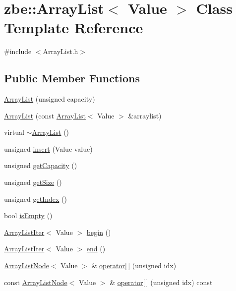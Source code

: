 \hypertarget{classzbe_1_1_array_list}{}\section{zbe\+:\+:Array\+List$<$ Value $>$ Class Template Reference}
\label{classzbe_1_1_array_list}


{\ttfamily \#include $<$Array\+List.\+h$>$}

\subsection*{Public Member Functions}
\begin{DoxyCompactItemize}
\item 
\hyperlink{classzbe_1_1_array_list_a5c68eae84a7d619114182e5efc26f6cd}{Array\+List} (unsigned capacity)
\item 
\hyperlink{classzbe_1_1_array_list_a512fb8d28a5e19493eabe7433738aa92}{Array\+List} (const \hyperlink{classzbe_1_1_array_list}{Array\+List}$<$ Value $>$ \&arraylist)
\item 
virtual \hyperlink{classzbe_1_1_array_list_a3ee1183e2a3ecda6f3e08cd180ccc09d}{$\sim$\+Array\+List} ()
\item 
unsigned \hyperlink{classzbe_1_1_array_list_aef119e95e8f11c2caf400e02a9b243d2}{insert} (Value value)
\item 
unsigned \hyperlink{classzbe_1_1_array_list_a95ed9fffe9ca1db6fe7ff47ba41cbacc}{get\+Capacity} ()
\item 
unsigned \hyperlink{classzbe_1_1_array_list_a32ac4ac895263b57c7e4a17370c89b5f}{get\+Size} ()
\item 
unsigned \hyperlink{classzbe_1_1_array_list_a6e560121fa7d27cf639399d82f3b93c9}{get\+Index} ()
\item 
bool \hyperlink{classzbe_1_1_array_list_ac78cf70f5316419ea831be59f6da0865}{is\+Empty} ()
\item 
\hyperlink{classzbe_1_1_array_list_iter}{Array\+List\+Iter}$<$ Value $>$ \hyperlink{classzbe_1_1_array_list_ac8bebe3ecea3f4fb2ef350486064d0f3}{begin} ()
\item 
\hyperlink{classzbe_1_1_array_list_iter}{Array\+List\+Iter}$<$ Value $>$ \hyperlink{classzbe_1_1_array_list_a6dd1456adf6fc7f2a9a3270975edf9a0}{end} ()
\item 
\hyperlink{structzbe_1_1_array_list_node}{Array\+List\+Node}$<$ Value $>$ \& \hyperlink{classzbe_1_1_array_list_aec1604b7c32438842b1413ce73889407}{operator\mbox{[}$\,$\mbox{]}} (unsigned idx)
\item 
const \hyperlink{structzbe_1_1_array_list_node}{Array\+List\+Node}$<$ Value $>$ \& \hyperlink{classzbe_1_1_array_list_a50210d2b4bf4b00cf7b1e278265e36fe}{operator\mbox{[}$\,$\mbox{]}} (unsigned idx) const 
\end{DoxyCompactItemize}


